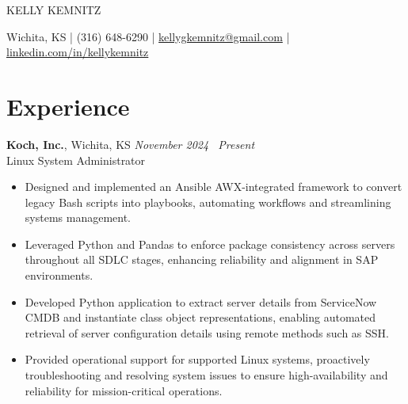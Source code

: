 \documentclass[10pt]{article}       %
\begin{document}
\centerline{\Huge KELLY KEMNITZ}

\vspace{5pt}

\centerline{\large Wichita, KS | (316) 648-6290 | \href{mailto:kellygkemnitz@gmail.com}{kellygkemnitz@gmail.com} | \href{https://www.linkedin.com/in/kellykemnitz/}{linkedin.com/in/kellykemnitz}}

\vspace{-10pt}

\section*{Experience}
\textbf{Koch, Inc.}, Wichita, KS \hfill \textit{November 2024 \textendash\ Present} \\
\vspace{1pt}
Linux System Administrator \\
\begin{itemize}
  \item Designed and implemented an Ansible AWX-integrated framework to convert legacy Bash scripts into playbooks, automating workflows and streamlining systems management.
  \item Leveraged Python and Pandas to enforce package consistency across servers throughout all SDLC stages, enhancing reliability and alignment in SAP environments.
  \item Developed Python application to extract server details from ServiceNow CMDB and instantiate class object representations, enabling automated retrieval of server configuration details using remote methods such as SSH.
  \item Provided operational support for supported Linux systems, proactively troubleshooting and resolving system issues to ensure high-availability and reliability for mission-critical operations.
\end{itemize}
\end{document}
